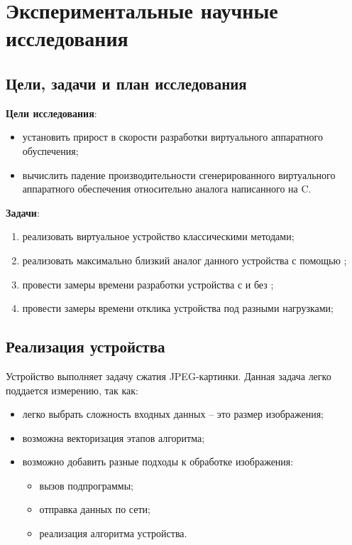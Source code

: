 \chapter{Экспериментальные научные исследования}\label{ch:ch3}

\section{Цели, задачи и план исследования}\label{sec:ch3/sec1}

\textbf{Цели исследования}:
\begin{itemize}
    \item установить прирост в скорости разработки виртуального аппаратного обуспечения;
    \item вычислить падение производительности сгенерированного виртуального аппаратного обеспечения
    относительно аналога написанного на C.
\end{itemize}


\textbf{Задачи}:
\begin{enumerate}[label={\arabic*)}]
    \item реализовать виртуальное устройство классическими методами;
    \item реализовать максимально близкий аналог данного устройства с
        помощью {\mylanguage};
    \item провести замеры времени разработки устройства
        с и без {\mylanguage};
    \item провести замеры времени отклика устройства
        под разными нагрузками;
\end{enumerate}


\section{Реализация устройства}\label{sec:ch3/sec2}

Устройство выполняет задачу сжатия JPEG-картинки.
Данная задача легко поддается измерению, так как:
\begin{itemize}
    \item легко выбрать сложность входных данных -- это
        размер изображения;
    \item возможна векторизация этапов алгоритма;
    \item возможно добавить разные подходы к обработке
        изображения:
        \begin{itemize}
            \item вызов подпрограммы;
            \item отправка данных по сети;
            \item реализация алгоритма устройства.
        \end{itemize}
\end{itemize}

